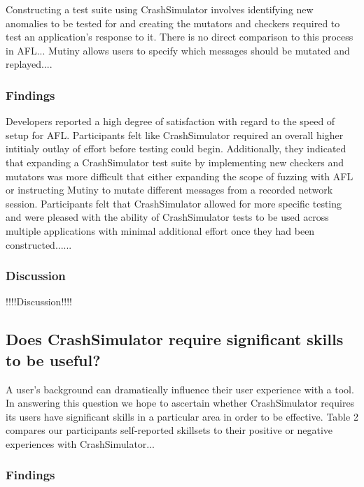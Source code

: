 Constructing a test suite using CrashSimulator involves identifying new
anomalies to be tested for and creating the mutators and checkers required
to test an application's response to it.  There is no direct comparison to
this process in AFL...  Mutiny allows users to specify which messages
should be mutated and replayed....


\subsubsection{Findings}

Developers reported a high degree of satisfaction with regard to the speed
of setup for AFL.  Participants felt like CrashSimulator required an
overall higher intitialy outlay of effort before testing could begin.
Additionally, they indicated that expanding a CrashSimulator test suite by
implementing new checkers and mutators was more difficult that either
expanding the scope of fuzzing with AFL or instructing Mutiny to mutate
different messages from a recorded network session.  Participants felt that
CrashSimulator allowed for more specific testing and were pleased with the
ability of CrashSimulator tests to be used across multiple applications
with minimal additional effort once they had been constructed......


\subsubsection{Discussion}

!!!!Discussion!!!!


\subsection{Does CrashSimulator require significant skills to be useful?}

A user's background can dramatically influence their user experience with a
tool.  In answering this question we hope to ascertain whether
CrashSimulator requires its users have significant skills in a particular
area in order to be effective.  Table 2 compares our participants
self-reported skillsets to their positive or negative experiences with
CrashSimulator...


\subsubsection{Findings}

